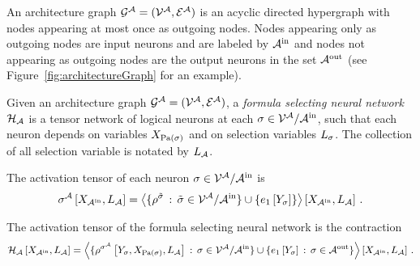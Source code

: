 \begin{definition}\label{def:fsNeuralNetwork}

	
	An architecture graph $\mathcal{G}^{\mathcal{A}}=(\mathcal{V}^{\mathcal{A}},\mathcal{E}^{\mathcal{A}})$ is an acyclic directed hypergraph with nodes appearing at most once as outgoing nodes.
	Nodes appearing only as outgoing nodes are input neurons and are labeled by $\mathcal{A}^{\mathrm{in}}$ and nodes not appearing as outgoing nodes are the output neurons in the set $\mathcal{A}^{\mathrm{out}}$ (see Figure~\ref{fig:architectureGraph} for an example).

	Given an architecture graph $\mathcal{G}^{\mathcal{A}}=(\mathcal{V}^{\mathcal{A}},\mathcal{E}^{\mathcal{A}})$, a \emph{formula selecting neural network} $\mathcal{H}_{\mathcal{A}}$ is a tensor network of logical neurons at each $\sigma\in\mathcal{V}^{\mathcal{A}}/\mathcal{A}^{\mathrm{in}}$, such that each neuron depends on variables $X_{\mathrm{Pa}(\sigma)}$ and on selection variables $L_{\sigma}$.
	The collection of all selection variable is notated by $L_{\mathcal{A}}$.

	The activation tensor of each neuron $\sigma\in\mathcal{V}^{\mathcal{A}}/\mathcal{A}^{\mathrm{in}}$ is
	\begin{align*}
		\sigma^{\mathcal{A}}\left[X_{\mathcal{A}^{\mathrm{in}}},L_{\mathcal{A}}\right] 
		= \left\langle 
			\{\rho^{\tilde{\sigma}} \, : \, \tilde{\sigma}\in\mathcal{V}^{\mathcal{A}}/\mathcal{A}^{\mathrm{in}} \} \cup \{e_{1}\left[Y_{\sigma}\right]\}
		\right\rangle \left[ X_{\mathcal{A}^{\mathrm{in}}},L_{\mathcal{A}} \right] \, . 
	\end{align*}
		
	The activation tensor of the formula selecting neural network is the contraction
	\begin{align*}
		\mathcal{H}_{\mathcal{A}}\left[X_{\mathcal{A}^{\mathrm{in}}},L_{\mathcal{A}}\right] 
		= \left\langle 
			\{\rho^{\sigma^{\mathcal{A}}}\left[Y_{\sigma},X_{\mathrm{Pa}(\sigma)},L_{\mathcal{A}}\right] \, : \, \sigma\in\mathcal{V}^{\mathcal{A}}/\mathcal{A}^{\mathrm{in}} \} \cup \{e_{1}\left[Y_{\sigma}\right] \, : \, \sigma\in\mathcal{A}^{\mathrm{out}}\}
		\right\rangle \left[ X_{\mathcal{A}^{\mathrm{in}}},L_{\mathcal{A}} \right] \, . 
	\end{align*}
	

\end{definition}

